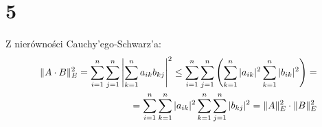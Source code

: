 \documentclass{article}
\DeclarePairedDelimiter{\norm}{\lVert}{\rVert}
\begin{document}
\section{5}
Z nierówności Cauchy'ego-Schwarz'a:
\begin{align*}
\norm{A\cdot B}_E^2 = \sum_{i=1}^n\sum_{j=1}^n \left | \sum_{k=1}^n a_{ik} b_{kj}\right|^2 \leq \sum_{i=1}^n\sum_{j=1}^n  \left( \sum_{k=1}^n |a_{ik}|^2 \sum_{k=1}^n |b_{ik}|^2\right)= \\ =\sum_{i=1}^n\sum_{k=1}^n |a_{ik}|^2 \sum_{k=1}^n\sum_{j=1}^n |b_{kj}|^2 = \norm{A}_E^2 \cdot \norm{B}_E^2
\end{align*}
\end{document}
